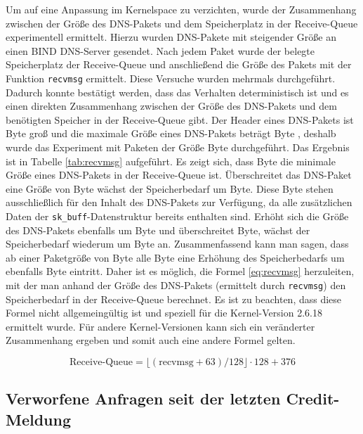 \documentclass[a4paper, 12pt, BCOR10mm, DIV12, toc=bibliography, toc=listof, german]{scrbook}
\begin{document}
		Um auf eine Anpassung im Kernelspace zu verzichten, wurde der Zusammenhang zwischen der Größe
		des DNS-Pakets und dem Speicherplatz in der Receive-Queue experimentell ermittelt. Hierzu
		wurden DNS-Pakete mit steigender Größe an einen BIND DNS-Server gesendet. Nach jedem Paket wurde
		der belegte Speicherplatz der Receive-Queue und anschließend die Größe des Pakets mit
		der Funktion \texttt{recvmsg} ermittelt. Diese Versuche wurden mehrmals durchgeführt. Dadurch
		konnte bestätigt werden, dass das Verhalten deterministisch ist und es einen direkten Zusammenhang
		zwischen der Größe des DNS-Pakets und dem benötigten Speicher in der Receive-Queue gibt. Der
		Header eines DNS-Pakets ist \unit[12]{Byte} groß und die maximale Größe eines DNS-Pakets beträgt
		\unit[512]{Byte}
		\cite{rfc1035}, deshalb wurde das Experiment mit Paketen der Größe \unit[12-576]{Byte} durchgeführt. Das
		Ergebnis ist in Tabelle \ref{tab:recvmsg} aufgeführt. Es zeigt sich, dass \unit[376]{Byte} die minimale
		Größe eines DNS-Pakets in der Receive-Queue ist. Überschreitet das DNS-Paket eine Größe von
		\unit[64]{Byte} wächst der Speicherbedarf um \unit[128]{Byte}. Diese \unit[128]{Byte} stehen ausschließlich für den Inhalt
		des DNS-Pakets zur Verfügung, da alle zusätzlichen Daten der \texttt{sk\_buff}-Datenstruktur
		bereits enthalten sind. Erhöht sich die Größe des DNS-Pakets ebenfalls um \unit[128]{Byte} und
		überschreitet \unit[192]{Byte}, wächst der Speicherbedarf wiederum um \unit[128]{Byte} an. Zusammenfassend
		kann man sagen, dass ab einer Paketgröße von \unit[64]{Byte} alle \unit[128]{Byte} eine Erhöhung des
		Speicherbedarfs um ebenfalls \unit[128]{Byte} eintritt. Daher ist es möglich, die Formel \ref{eq:recvmsg}
		herzuleiten, mit der man anhand der Größe des DNS-Pakets (ermittelt durch \texttt{recvmsg}) den
		Speicherbedarf in der Receive-Queue berechnet. Es ist zu beachten, dass diese Formel nicht
		allgemeingültig ist und speziell für die Kernel-Version 2.6.18 ermittelt wurde. Für andere
		Kernel-Versionen kann sich ein veränderter Zusammenhang ergeben und somit auch eine andere
		Formel gelten.

		\begin{equation}
			\text{Receive-Queue} = \lfloor (\text{recvmsg} + 63) / 128 \rfloor \cdot 128 + 376
			\label{eq:recvmsg}
		\end{equation}



		\subsection*{Verworfene Anfragen seit der letzten Credit-Meldung} %
\end{document}
